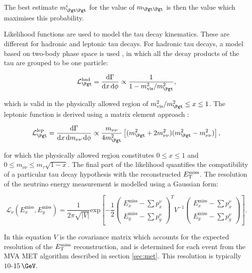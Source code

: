 The best estimate $m_{\Pgt\Pgt}^{i}$ for the value of $m_{\Pgt\Pgt}$ is then the value which maximises this probability. 

Likelihood functions are used to model the tau decay kinematics. These are
different for hadronic and leptonic tau decays. For hadronic tau decays, a model
based on two-body phase space is used \cite{PDG}, in which all the decay products of the
tau are grouped to be one particle:

\begin{equation}
\mathcal{L}_{\Pgt}^{\text{had}} = \frac{\text{d}\Gamma}{\text{d}x\,\text{d}\phi}
\propto \frac{1}{1 - m_{\text{vis}}^{2} / m_{\Pgt}^{2}},
\end{equation}

which is valid in the physically allowed region of $m_{\text{vis}}^{2} /
m_{\Pgt}^{2} \leq x \leq 1$. The leptonic function is derived using a matrix
element approach \cite{TauPol}:

\begin{equation}
\mathcal{L}_{\Pgt}^{\text{lep}} =
\frac{\text{d}\Gamma}{\text{d}x\,\text{d}m_{\nu\nu}\,\text{d}\phi} \propto
\frac{m_{\nu\nu}}{4m_{\Pgt}^{2}}\left[(m_{\Pgt}^{2}+2m_{\nu\nu}^{2})(m_{\Pgt}^{2}-m_{\nu\nu}^{2})\right],
\end{equation}

for which the physically allowed region constitutes $0 \leq x \leq 1$ and $0
\leq m_{\nu\nu} \leq m_{\tau}\sqrt{1-x}$. The final part of the likelihood
quantifies the compatibility of a particular tau decay hypothesis with the
reconstructed $E_{\mathrm{T}}^{\text{miss}}$. The resolution of the neutrino energy measurement is
modelled using a Gaussian form:

\begin{equation}
\mathcal{L}_{\nu}(E_{x}^{\text{miss}},E_{y}^{\text{miss}}) =
\frac{1}{2\pi\sqrt{|V|}}\text{exp}\left[
-\frac{1}{2}\begin{pmatrix}E_{x}^{\text{miss}}-\sum p_{x}^{\nu} \\
E_{y}^{\text{miss}}-\sum p_{y}^{\nu}\end{pmatrix}^{T} V^{-1}
\begin{pmatrix}E_{x}^{\text{miss}}-\sum p_{x}^{\nu} \\ E_{y}^{\text{miss}}-\sum
p_{y}^{\nu}\end{pmatrix}\right].
\end{equation}

In this equation $V$ is the covariance matrix which accounts for the expected
resolution of the $E_{\mathrm{T}}^{\text{miss}}$ reconstruction, and is determined for each event from
the MVA MET algorithm described in section \ref{sec:met}. This resolution is
typically $10$-$15\,\GeV$. 

